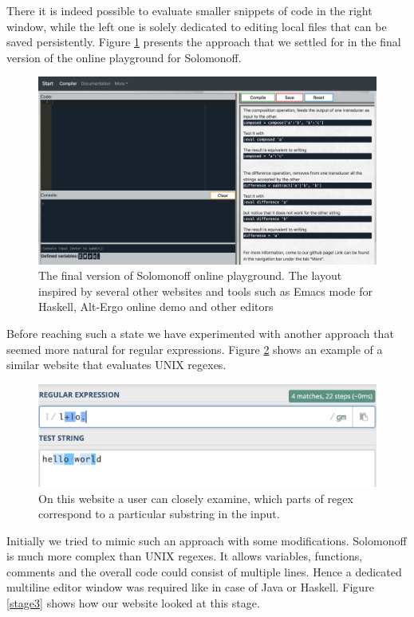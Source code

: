 There it is indeed possible to evaluate smaller snippets of code in the right window, while the left one is solely dedicated to editing local files that can be saved persistently. Figure \ref{final} presents the approach that we settled for in the final version of the online playground for Solomonoff.
\begin{figure}
	\centering
	\includegraphics[scale=0.3]{web8.png}
	\caption{The final version of Solomonoff online playground. The layout inspired by several other websites and tools such as Emacs mode for Haskell, Alt-Ergo online demo and other editors}
	\label{final}
\end{figure}
Before reaching such a state we have experimented with another approach that seemed more natural for regular expressions. Figure \ref{regex} shows an example of a similar website that evaluates UNIX regexes.
\begin{figure}
	\centering
	\includegraphics[scale=0.65]{regex.png}
	\caption{On this website a user can closely examine, which parts of regex correspond to a particular substring in the input.}
	\label{regex}
\end{figure}
Initially we tried to mimic such an approach with some modifications. Solomonoff is much more complex than UNIX regexes. It allows variables, functions, comments and the overall code could consist of multiple lines. Hence a dedicated multiline editor window was required like in case of Java or Haskell. Figure \ref{stage3} shows how our website looked at this stage.
